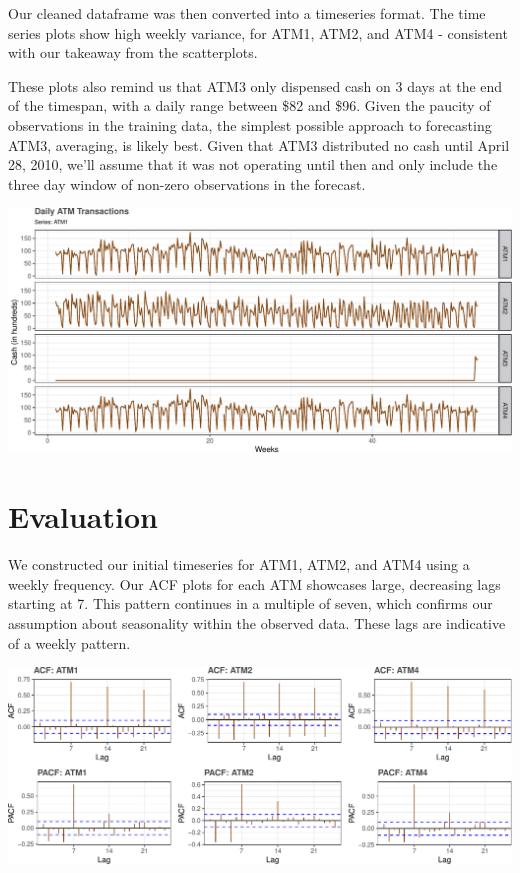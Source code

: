 \documentclass[openany]{book}
\begin{document}
Our cleaned dataframe was then converted into a timeseries format. The
time series plots show high weekly variance, for ATM1, ATM2, and ATM4 -
consistent with our takeaway from the scatterplots.

These plots also remind us that ATM3 only dispensed cash on 3 days at
the end of the timespan, with a daily range between \$82 and \$96. Given
the paucity of observations in the training data, the simplest possible
approach to forecasting ATM3, averaging, is likely best. Given that ATM3
distributed no cash until April 28, 2010, we'll assume that it was not
operating until then and only include the three day window of non-zero
observations in the forecast.

\includegraphics{Group2_Project1_Fall2019_files/figure-latex/unnamed-chunk-3-1.pdf}

\hypertarget{evaluation}{%
\section{Evaluation}\label{evaluation}}

We constructed our initial timeseries for ATM1, ATM2, and ATM4 using a
weekly frequency. Our ACF plots for each ATM showcases large, decreasing
lags starting at 7. This pattern continues in a multiple of seven, which
confirms our assumption about seasonality within the observed data.
These lags are indicative of a weekly pattern. \newline

\includegraphics{Group2_Project1_Fall2019_files/figure-latex/unnamed-chunk-4-1.pdf}
\end{document}
